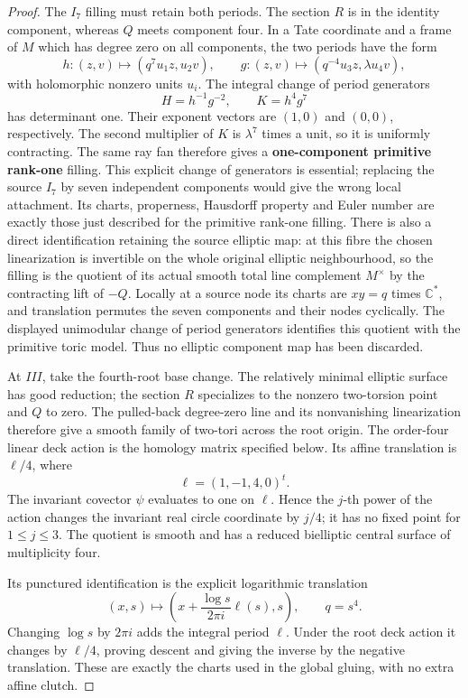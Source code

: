 \begin{proof}
The \(I_7\) filling must retain both periods. The section \(R\) is in the identity component, whereas \(Q\) meets component four. In a Tate coordinate and a frame of \(M\) which has degree zero on all components, the two periods have the form \[
 h:(z,v)\longmapsto(q^7u_1z,u_2v),\qquad
 g:(z,v)\longmapsto(q^{-4}u_3z,\lambda u_4v),
\] with holomorphic nonzero units \(u_i\). The integral change of period generators \[
 H=h^{-1}g^{-2},\qquad K=h^4g^7
\] has determinant one. Their exponent vectors are \((1,0)\) and \((0,0)\), respectively. The second multiplier of \(K\) is \(\lambda^7\) times a unit, so it is uniformly contracting. The same ray fan therefore gives a \textbf{one-component primitive rank-one} filling. This explicit change of generators is essential; replacing the source \(I_7\) by seven independent components would give the wrong local attachment. Its charts, properness, Hausdorff property and Euler number are exactly those just described for the primitive rank-one filling. There is also a direct identification retaining the source elliptic map: at this fibre the chosen linearization is invertible on the whole original elliptic neighbourhood, so the filling is the quotient of its actual smooth total line complement \(M^\times\) by the contracting lift of \(-Q\). Locally at a source node its charts are \(xy=q\) times \(\mathbb C^*\), and translation permutes the seven components and their nodes cyclically. The displayed unimodular change of period generators identifies this quotient with the primitive toric model. Thus no elliptic component map has been discarded.

At \(III\), take the fourth-root base change. The relatively minimal elliptic surface has good reduction; the section \(R\) specializes to the nonzero two-torsion point and \(Q\) to zero. The pulled-back degree-zero line and its nonvanishing linearization therefore give a smooth family of two-tori across the root origin. The order-four linear deck action is the homology matrix specified below. Its affine translation is \(\ell/4\), where \[
 \ell=(1,-1,4,0)^t.
\] The invariant covector \(\psi\) evaluates to one on \(\ell\). Hence the \(j\)-th power of the action changes the invariant real circle coordinate by \(j/4\); it has no fixed point for \(1\leq j\leq3\). The quotient is smooth and has a reduced bielliptic central surface of multiplicity four.

Its punctured identification is the explicit logarithmic translation \[
 (x,s)\longmapsto
 \left(x+\frac{\log s}{2\pi i}\ell(s),s\right),\qquad q=s^4.
\] Changing \(\log s\) by \(2\pi i\) adds the integral period \(\ell\). Under the root deck action it changes by \(\ell/4\), proving descent and giving the inverse by the negative translation. These are exactly the charts used in the global gluing, with no extra affine clutch.


\end{proof}
